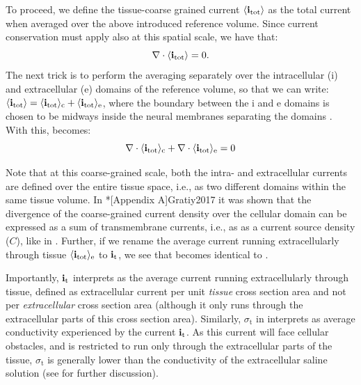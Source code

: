 To proceed, we define the tissue-coarse grained current $\left<{\bf i}_\text{tot}\right>$ as the total current when averaged over the above introduced reference volume. Since current conservation must apply also at this spatial scale, we have that:
\begin{equation}
{\bf \nabla} \cdot \langle{\bf i}_\text{tot}\rangle = 0.
\label{eq:Basics:Sergey2}
\end{equation}
The next trick is to perform the averaging separately over the intracellular (i) and extracellular (e) domains of the reference volume, so that we can write: $\langle{\bf i}_\text{tot}\rangle = \langle{\bf i}_\text{tot}\rangle_\text{c} + \langle{\bf i}_\text{tot}\rangle_\text{e}$, where the boundary between the i and e domains is chosen to be midways inside the neural membranes separating the domains . With this,  becomes: 
\begin{equation}
{\bf \nabla} \cdot \langle{\bf i}_\text{tot}\rangle_\text{c}  + {\bf \nabla}\cdot \langle{\bf i}_\text{tot}\rangle_\text{e} = 0
\label{eq:Basics:Sergey3}
\end{equation}

Note that at this coarse-grained scale, both the intra- and extracellular currents are defined over the entire tissue space, i.e., as two different domains within the same tissue volume. In \citeasnoun**[Appendix A]{Gratiy2017} it was shown that the divergence of the coarse-grained current density over the cellular domain can be expressed as a sum of transmembrane currents, i.e., as as a current source density ($C$), like in . Further, if we rename the average current running extracellularly through tissue $\langle{\bf i}_\text{tot}\rangle_\text{e}$ to ${\bf i}_\text{t}$, we see that  becomes identical to  . 

Importantly, ${\bf i}_\text{t}$ interprets as the average current running extracellularly through tissue, defined as extracellular current per unit \textit{tissue} cross section area and not per \textit{extracellular} cross section area (although it only runs through the extracellular parts of this cross section area). Similarly, $\sigma_\text{t}$ in  interprets as average conductivity experienced by the current ${\bf i}_\text{t}$. As this current will face cellular obstacles, and is restricted to run only through the extracellular parts of the tissue, $\sigma_\text{t}$ is generally lower than the conductivity of the extracellular saline solution (see  for further discussion). 


